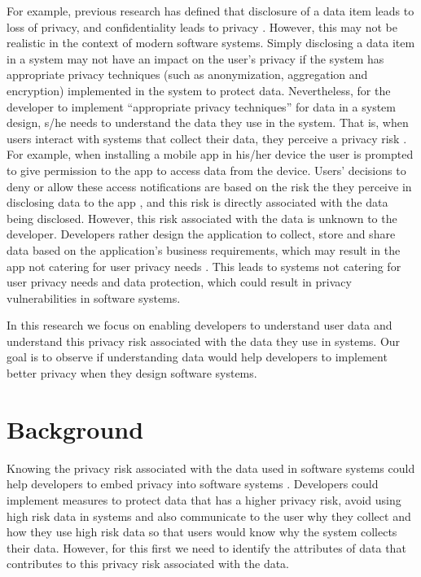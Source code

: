 \documentclass{sigchi}
\begin{document}
For example, previous research has defined that disclosure of a data item leads to loss of privacy, and confidentiality leads to privacy \cite {gurses2014can}. However, this may not be realistic in the context of modern software systems. Simply disclosing a data item in a system may not have an impact on the user's privacy if the system has appropriate privacy techniques (such as anonymization, aggregation and encryption) implemented in the system to protect data. Nevertheless, for the developer to implement \enquote{appropriate privacy techniques} for data in a system design, s/he needs to understand the data they use in the system. That is, when users interact with systems that collect their data, they perceive a privacy risk \cite {malheiros2013fairly}. For example, when installing a mobile app in his/her device the user is prompted to give permission to the app to access data from the device. Users' decisions to deny or allow these access notifications are based on the risk the they perceive in disclosing data to the app \cite {kobsa2007privacy, li2010understanding, malhotra2004internet}, and this risk is directly associated with the data being disclosed. However, this risk associated with the data is unknown to the developer. Developers rather design the application to collect, store and share data based on the application's business requirements, which may result in the app not catering for user privacy needs \cite {senarath2018under}. This leads to systems not catering for user privacy needs and data protection, which could result in privacy vulnerabilities in software systems. 

In this research we focus on enabling developers to understand user data and understand this privacy risk associated with the data they use in systems. Our goal is to observe if understanding data would help developers to implement better privacy when they design software systems. 

\section {Background} 

Knowing the privacy risk associated with the data used in software systems could help developers to embed privacy into software systems \cite {senarath2018under}. Developers could implement measures to protect data that has a higher privacy risk, avoid using high risk data in systems and also communicate to the user why they collect and how they use high risk data so that users would know why the system collects their data. However, for this first we need to identify the attributes of data that contributes to this privacy risk associated with the data.
\end{document}
